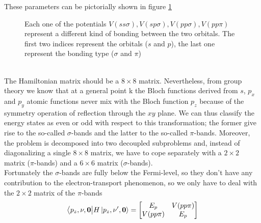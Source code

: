 These parameters can be pictorially shown in figure \ref{fig:grapheneorbitals}
\begin{figure}[h]
    \caption{Each one of the potentials $V(ss\sigma),V(sp\sigma),V(pp\sigma),V(pp\pi)$ represent a different kind of bonding between the two orbitals. The first two indices represent the orbitals ($s$ and $p$), the last one represent the bonding type ($\sigma$ and $\pi$)}
    \label{fig:grapheneorbitals}
\end{figure}\\
The Hamiltonian matrix should be a $8 \times 8$ matrix. Nevertheless, from group theory we know that at a general point k the Bloch functions derived from $s$, $p_x$ and $p_y$ atomic functions never mix with the Bloch function $p_z$ because of the symmetry operation of reflection through the $xy$ plane. We can thus classify the energy states as even or odd with respect to this transformation; the former give rise to the so-called $\sigma$-bands and the latter to the so-called $\pi$-bands. Moreover, the problem is decomposed into two decoupled subproblems and, instead of diagonalizing a single $8 \times 8$ matrix, we have to cope separately with a $2 \times 2$ matrix ($\pi$-bands) and a $6 \times 6$ matrix
($\sigma$-bands).\\
Fortunately the $\sigma$-bands are fully below the Fermi-level, so they don't have any contribution to the electron-transport phenomenon, so we only have to deal with the $2\times 2$ matrix of the $\pi$-bands
\begin{equation}
    \big\langle p_z,\nu,\mathbf{0}\big|H\ket{p_z,\nu',\mathbf{0}}=
    \begin{bmatrix}
        E_p & V(pp\pi)\\
        V(pp\pi) & E_p
    \end{bmatrix}
\end{equation}

